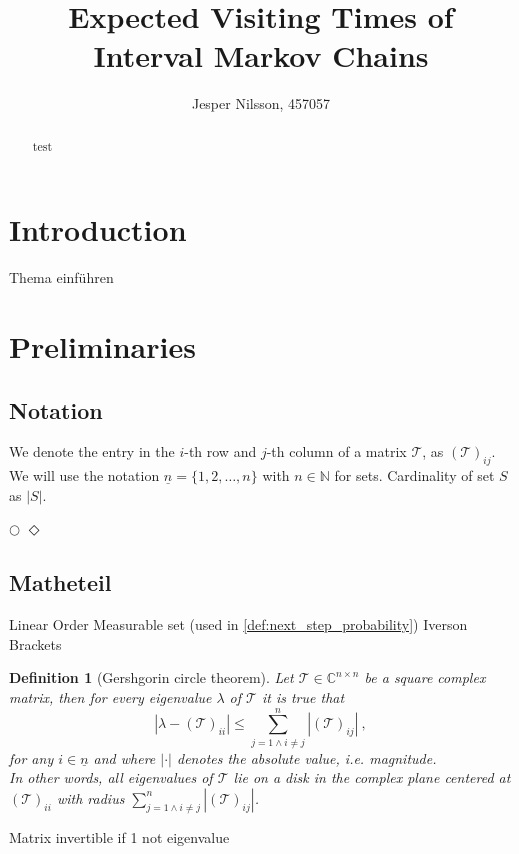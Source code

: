 \documentclass[journal,compsoc,10pt]{IEEEtran}
\newcommand{\CC}{\mathbb{C}}
\newcommand{\NN}{\mathbb{N}}
\newcommand{\tT}{\mathcal{T}} %
\newcommand{\cCircle}{\bigcirc} %
\newtheorem{definition}{Definition}[section]
\begin{document}

\title{Expected Visiting Times of Interval Markov Chains}

\author{Jesper Nilsson, 457057}

\maketitle
\thispagestyle{plain}
\pagestyle{plain}

\begin{abstract}
    test
\end{abstract}


\section{Introduction}
Thema einführen 

\section{Preliminaries}
\subsection{Notation}\label{sec:notation}
We denote the entry in the $i$-th row and $j$-th column of a matrix $\tT$, as $(\tT)_{ij}$. We will use the notation $\underline{n} = \{1, 2, \dots, n\}$ with $n\in \NN$ for sets.
Cardinality of set $S$ as $|S|$.

$\cCircle$
$\Diamond$

\subsection{Matheteil}\label{sec:matheteil}
Linear Order
Measurable set (used in \cref{def:next_step_probability})
Iverson Brackets
\begin{definition}[Gershgorin circle theorem]\label{def:gershgorin_theorem}
    Let $\tT\in \CC^{n\times n}$ be a square complex matrix, then for every eigenvalue $\lambda$ of $\tT$ it is true that 
    \[|\lambda-(\tT)_{ii}|\leq\sum_{j=1\land i\neq j}^n|(\tT)_{ij}|\ ,\] 
    for any $i\in \underline{n}$ and where $|\cdot|$ denotes the absolute value, i.e. magnitude.\\
    In other words, all eigenvalues of $\tT$ lie on a disk in the complex plane centered at $(\tT)_{ii}$ with radius $\sum_{j=1\land i\neq j}^n|(\tT)_{ij}|$.
\end{definition}
Matrix invertible if 1 not eigenvalue
\end{document}

